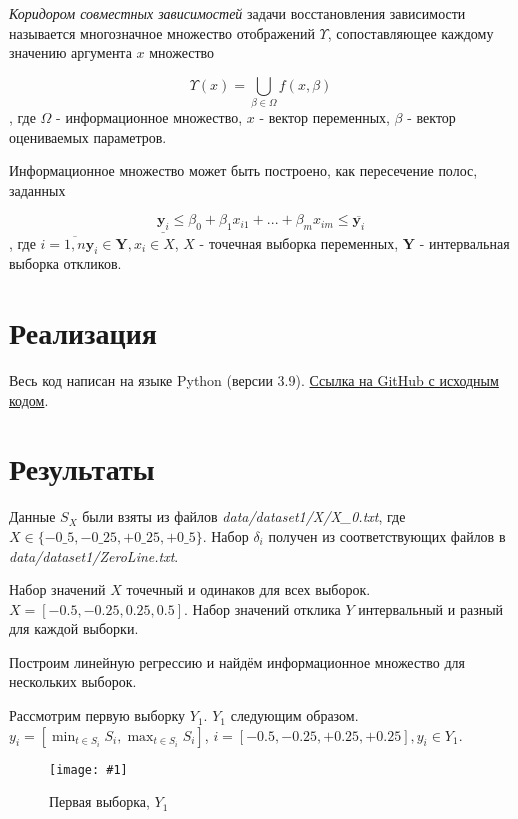 \documentclass[a4paper,12pt]{article}
\newcommand{\plot}[3]{
    \begin{figure}[H]
        \begin{center}
            \texttt{[image: \#1]}
            \caption{#2}
            \label{#3}
        \end{center}
    \end{figure}
}
\begin{document}
    \textsl{Коридором совместных зависимостей} задачи восстановления зависимости
    называется многозначное множество отображений $ \Upsilon $, сопоставляющее
    каждому значению аргумента $ x $ множество

    \begin{equation}
        \Upsilon(x) = \bigcup_{\beta \in \Omega} f(x, \beta)
    \end{equation}
    , где $ \Omega $ - информационное множество, $ x $ - вектор переменных, $ \beta $ - вектор оцениваемых параметров.

    Информационное множество может быть построено, как пересечение полос, заданных

    \begin{equation}
        \underline{\textbf{y}_i} \leq \beta_0 + \beta_1 x_{i1} + ... + \beta_m x_{im} \leq \overline{\textbf{y}_i}
    \end{equation}
    , где $ i = \overline{1, n} \textbf{y}_i \in \textbf{Y}, x_i \in X $, $ X $ - точечная выборка переменных,
    $ \textbf{Y} $ - интервальная выборка откликов.

    \section{Реализация}
    \quad Весь код написан на языке Python (версии 3.9).
    \href{https://github.com/gobdr/interval_data_analysis/tree/master/lab2}{Ссылка на GitHub с исходным кодом}.

    \section{Результаты}
    \quad Данные $ S_X $ были взяты из файлов \textsl{data/dataset1/X/X\_0.txt}, \newline
    где $ X \in \{-0\_5, -0\_25, +0\_25, +0\_5 \} $.
    Набор $ \delta_i $ получен из соответствующих файлов в \textsl{data/dataset1/ZeroLine.txt}.

    Набор значений $ X $ точечный и одинаков для всех выборок. \newline
    $ X = [-0.5, -0.25, 0.25, 0.5]  $.
    Набор значений отклика $ Y $ интервальный и разный для каждой выборки.

    Построим линейную регрессию и найдём информационное множество для нескольких выборок.

    Рассмотрим первую выборку $ Y_1 $.
    $ Y_1 $ следующим образом. $ y_i = [\min_{t \in S_i}{S_i}, \max_{t \in S_i}{S_i}]$,
    $ i = [-0.5, -0.25, +0.25, +0.25], y_i \in Y_1 $.
    \plot{Y1}{Первая выборка, $ Y_1 $}{p:sampleY1}
\end{document}
